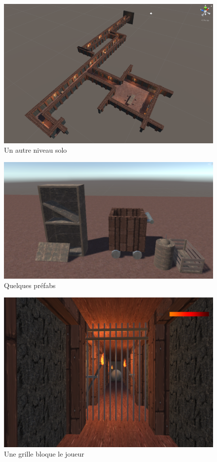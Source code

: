 \documentclass[titlepage, 13px, a4paper]{report}
\begin{document}
\begin{figure}[h!]
  \centering
  \includegraphics[width=13cm]{images/annexe_level1.png}
  \caption{Un autre niveau solo}
\end{figure}

\begin{figure}[h!]
  \centering
  \includegraphics[width=13cm]{images/annexe_prefabs.png}
  \caption{Quelques préfabs}
\end{figure}

\begin{figure}[h!]
  \centering
  \includegraphics[width=13cm]{images/annexe_grille.png}
  \caption{Une grille bloque le joueur}
\end{figure}
\end{document}
